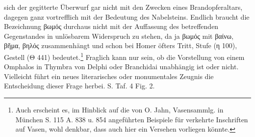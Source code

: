\documentclass[a4paper, 11pt, oneside]{article}
\begin{document}
sich der gegitterte Überwurf gar nicht mit den Zwecken eines Brandopferaltars, dagegen ganz vortrefflich mit der Bedeutung des Nabelsteins. Endlich braucht die Bezeichnung βωμός durchaus nicht mit der Auffassung des betreffenden Gegenstandes in unlösbarem Widerspruch zu stehen, da ja βωμός mit βαίνω, βῆμα, βηλός zusammenhängt und schon bei Homer öfters Tritt, Stufe (η 100), Gestell (Θ 441) bedeutet.\footnote{Auch erscheint es, im Hinblick auf die von O. Jahn, Vasensammlg. in München S. 115 A. 838 u. 854 angeführten Beispiele für verkehrte Inschriften auf Vasen, wohl denkbar, dass auch hier ein Versehen vorliegen könnte.} Fraglich kann nur sein, ob die Vorstellung von einem Omphalos in Thymbra von Delphi oder Branchidai unabhängig ist oder nicht. Vielleicht führt ein neues literarisches oder monumentales Zeugnis die Entscheidung dieser Frage herbei. S. Taf. 4 Fig. 2.
\end{document}
